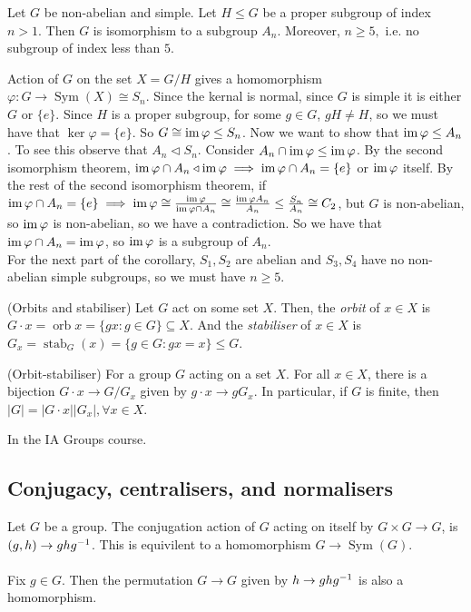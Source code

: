 \documentclass{article}
\newcommand{\nrm}{\triangleleft}
\DeclareMathOperator{\sym}{Sym}
\DeclareMathOperator{\orb}{orb}
\DeclareMathOperator{\stab}{stab}
\begin{document}
\begin{itemize}
\begin{corollary}
	  Let $ G $ be non-abelian and simple. Let $ H\le G $ be a proper subgroup of index $ n>1 $. Then $ G $ is isomorphism to a subgroup $ A_n $. Moreover, $ n\ge 5, $ i.e. no subgroup of index less than $ 5 $.
\end{corollary}
\pf Action of $ G $ on the set $ X=G/H $ gives a homomorphism $ \varphi:G\to \sym(X)\cong S_n $. Since the kernal is normal, since $ G $ is simple it is either $ G $ or $ \{e\} $. Since $ H $ is a proper subgroup, for some $ g\in G $, $ gH\ne H $, so we must have that $ \ker \varphi=\{e\} $. So $ G\cong \operatorname{im}\varphi\le S_n $. Now we want to show that $ \operatorname{im}\varphi\le A_n $. To see this observe that $ A_n\nrm S_n $. Consider $ A_n\cap \operatorname{im}\varphi\le \operatorname{im}\varphi $. By the second isomorphism theorem, $ \ima\varphi\cap A_n\nrm \ima\varphi\implies\ima\varphi\cap A_n=\{e\} $ or $ \operatorname{im}\varphi $ itself. By the rest of the second isomorphism theorem, if $ \operatorname{im}\varphi\cap A_n=\{e\}\implies \operatorname{im}\varphi\cong\frac{\operatorname{im}\varphi}{\operatorname{im}\varphi\cap A_n}\cong \frac{\operatorname{im}\varphi A_n}{A_n}\le \frac{S_n}{A_n} \cong C_2 $, but $ G $ is non-abelian, so $ \operatorname{im} \varphi $ is non-abelian, so we have a contradiction. So we have that $ \operatorname{im}\varphi\cap A_n =\operatorname{im}\varphi $, so $ \operatorname{im} \varphi $ is a subgroup of $ A_n $.\\
For the next part of the corollary, $ S_1,S_2 $ are abelian and $ S_3,S_4 $ have no non-abelian simple subgroups, so we must have $ n\ge 5 $.

\begin{definition}
	(Orbits and stabiliser) Let $ G $ act on some set $ X $. Then, the \textit{orbit} of $ x\in X $ is $ G\cdot x=\orb x=\{gx : g\in G\}\subseteq X $. And the \textit{stabiliser} of $ x\in X $ is $ G_x=\stab_G(x) = \{g\in G:gx=x\}\le G $.
\end{definition}
\begin{theorem}
	(Orbit-stabiliser) For a group $ G $ acting on a set $ X $. For all $ x\in X $, there is a bijection $ G\cdot x \to G/G_x $ given by $ g\cdot x \to gG_x $. In particular, if $ G $ is finite, then $ |G|=|G\cdot x||G_x|, \forall x\in X $.
\end{theorem}
\pf In the IA Groups course.
\subsection{Conjugacy, centralisers, and normalisers}
Let $ G $ be a group. The conjugation action of $ G $ acting on itself by $ G\times G\to G $, is $ (g,h)\to gh{g}^{-1} $. This is equivilent to a homomorphism $ G\to\sym(G) $.\\\\
Fix $ g\in G $. Then the permutation $ G\to G $ given by $ h\to gh{g}^{-1} $ is also a homomorphism.


\end{itemize}
\end{document}
